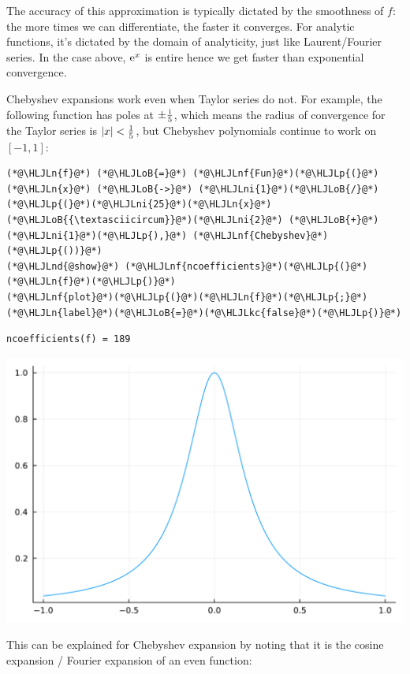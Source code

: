 \documentclass[12pt,a4paper]{article}
\newcommand{\HLJLkc}[1]{\textcolor[RGB]{59,151,46}{\textit{#1}}}
\newcommand{\HLJLn}[1]{#1}
\newcommand{\HLJLnd}[1]{\textcolor[RGB]{214,102,97}{#1}}
\newcommand{\HLJLnf}[1]{\textcolor[RGB]{66,102,213}{#1}}
\newcommand{\HLJLni}[1]{\textcolor[RGB]{59,151,46}{#1}}
\newcommand{\HLJLoB}[1]{\textcolor[RGB]{102,102,102}{\textbf{#1}}}
\newcommand{\HLJLp}[1]{#1}
\begin{document}
The accuracy of this approximation is typically dictated by the smoothness of $f$: the more times we can differentiate, the faster it converges. For analytic functions, it's dictated by the domain of analyticity, just like Laurent/Fourier series. In the case above, ${\rm e}^x$ is entire hence we get faster than exponential convergence.

Chebyshev expansions work even when Taylor series do not. For example, the following function has poles at $\pm {{\rm i} \over 5}$, which means the radius of convergence for the Taylor series is $|x| < {1 \over 5}$, but Chebyshev polynomials continue to work on $[-1,1]$:


\begin{lstlisting}
(*@\HLJLn{f}@*) (*@\HLJLoB{=}@*) (*@\HLJLnf{Fun}@*)(*@\HLJLp{(}@*) (*@\HLJLn{x}@*) (*@\HLJLoB{->}@*) (*@\HLJLni{1}@*)(*@\HLJLoB{/}@*)(*@\HLJLp{(}@*)(*@\HLJLni{25}@*)(*@\HLJLn{x}@*)(*@\HLJLoB{{\textasciicircum}}@*)(*@\HLJLni{2}@*) (*@\HLJLoB{+}@*) (*@\HLJLni{1}@*)(*@\HLJLp{),}@*) (*@\HLJLnf{Chebyshev}@*)(*@\HLJLp{())}@*)
(*@\HLJLnd{@show}@*) (*@\HLJLnf{ncoefficients}@*)(*@\HLJLp{(}@*)(*@\HLJLn{f}@*)(*@\HLJLp{)}@*)
(*@\HLJLnf{plot}@*)(*@\HLJLp{(}@*)(*@\HLJLn{f}@*)(*@\HLJLp{;}@*)(*@\HLJLn{label}@*)(*@\HLJLoB{=}@*)(*@\HLJLkc{false}@*)(*@\HLJLp{)}@*)
\end{lstlisting}

\begin{lstlisting}
ncoefficients(f) = 189
\end{lstlisting}

\includegraphics[width=\linewidth]{jl_dOthw0/OP_methods_24_1.pdf}

This can be explained for Chebyshev expansion by noting that it is the cosine expansion / Fourier expansion of an even function:
\end{document}
